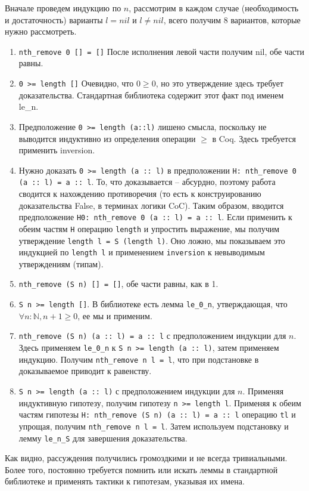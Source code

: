 Вначале проведем индукцию по $n$, рассмотрим в каждом случае (необходимость и достаточность) варианты $l = nil$ и $l \neq nil$, всего получим 8 вариантов, которые нужно рассмотреть.
\begin{enumerate}
\item \texttt{nth\_remove 0 [] = []} После исполнения левой части получим nil, обе части равны.
\item \texttt{0 >= length []} Очевидно, что $0 \geq 0$, но это утверждение здесь требует доказательства. Стандартная библиотека содержит этот факт под именем le\_n.
\item Предположение \texttt{0 >= length (a::l)} лишено смысла, поскольку не выводится индуктивно из определения операции $\geq$ в Coq. Здесь требуется применить inversion.
\item Нужно доказать \texttt{0 >= length (a :: l)} в предположении \texttt{H: nth\_remove 0 (a :: l) = a :: l}. То, что доказывается -- абсурдно, поэтому работа сводится к нахождению противоречия (то есть к конструированию доказательства False, в терминах логики CoC). Таким образом, вводится предположение \texttt{H0: nth\_remove 0 (a :: l) = a :: l}. Если применить к обеим частям \texttt{H} операцию \texttt{length} и упростить выражение, мы получим утверждение \texttt{length l = S (length l)}. Оно ложно, мы показываем это индукцией по \texttt{length l} и применением \texttt{inversion} к невыводимым утверждениям (типам).
\item \texttt{nth\_remove (S n) [] = []}, обе части равны, как в 1.
\item \texttt{S n >= length []}. В библиотеке есть лемма \texttt{le\_0\_n}, утверждающая, что $\forall n: \mathbb{N}, n + 1 \geq 0$, ее мы и применим.
\item \texttt{nth\_remove (S n) (a :: l) = a :: l} с предположением индукции для $n$. Здесь применяем \texttt{le\_0\_n} к \texttt{S n >= length (a :: l)}, затем применяем индукцию. Получим \texttt{nth\_remove n l = l}, что при подстановке в доказываемое приводит к равенству.
\item \texttt{S n >= length (a :: l)} с предположением индукции для $n$. Применяя индуктивную гипотезу, получим гипотезу \texttt{n >= length l}. Применяя к обеим частям гипотезы \texttt{H: nth\_remove (S n) (a :: l) = a :: l} операцию \texttt{tl} и упрощая, получим \texttt{nth\_remove n l = l}. Затем используем подстановку и лемму \texttt{le\_n\_S} для завершения доказательства.
\end{enumerate}

Как видно, рассуждения получились громоздкими и не всегда тривиальными. Более того, постоянно требуется помнить или искать леммы в стандартной библиотеке и применять тактики к гипотезам, указывая их имена.

